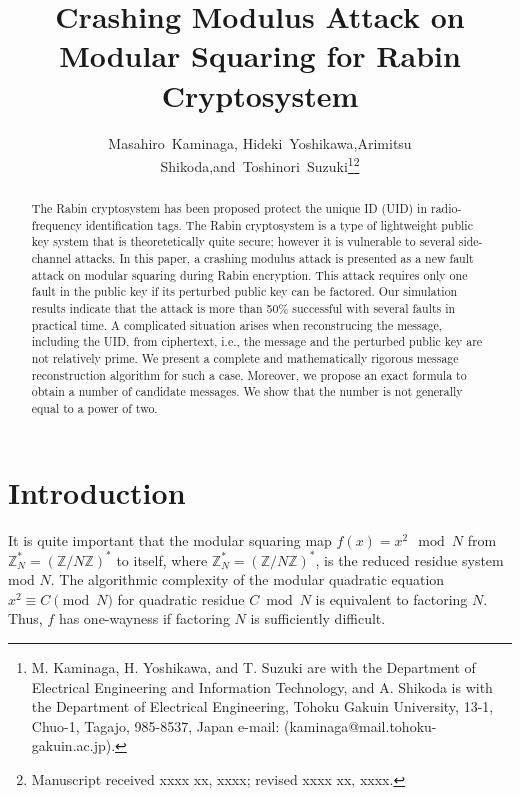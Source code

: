 \documentclass{article}
\begin{document}
\title{Crashing Modulus Attack on Modular Squaring for Rabin Cryptosystem}


\author{Masahiro~Kaminaga, Hideki~Yoshikawa,Arimitsu Shikoda,and~Toshinori~Suzuki\thanks{M. Kaminaga, H. Yoshikawa, and T. Suzuki are with the Department 
of Electrical Engineering and Information Technology, and A. Shikoda is with the Department 
of Electrical Engineering, Tohoku Gakuin University, 
13-1, Chuo-1, Tagajo, 985-8537, Japan e-mail: (kaminaga@mail.tohoku-gakuin.ac.jp).}\thanks{Manuscript received xxxx xx, xxxx; revised xxxx xx, xxxx.}}








\maketitle

\begin{abstract} The Rabin cryptosystem has been proposed protect the unique ID (UID) in
radio-frequency identification tags. 
The Rabin cryptosystem is a type of lightweight public key system that
is theoretetically quite secure; however it is vulnerable 
to several side-channel attacks. 
In this paper, a crashing modulus attack is presented as a new fault attack on
 modular squaring during Rabin encryption.
This attack requires only one fault in the public key if its perturbed public key can be factored. 
Our simulation results indicate that the attack is more than 50\% successful with several faults in practical time.
A complicated situation arises when reconstrucing the message, including the UID, from ciphertext, i.e., 
the message and the perturbed public key are not relatively prime. 
We present a complete and mathematically rigorous 
message reconstruction algorithm for such a case.
Moreover, we propose an exact formula to obtain a number of candidate messages.
We show that the number is not generally equal to a power of two.
\end{abstract}










\section{Introduction}\label{intro}
It is quite important that 
the modular squaring map $f(x) = x^2~\bmod N$ from $\mathbb{Z}_N^*=(\mathbb{Z}/N\mathbb{Z})^*$ to itself, 
where $\mathbb{Z}_N^*=(\mathbb{Z}/N\mathbb{Z})^*$, is the reduced residue system mod $N$.
The algorithmic complexity of 
the modular quadratic equation $x^2\equiv C\pmod{N}$ for quadratic residue $C\bmod N$ is equivalent to factoring $N$. 
Thus, $f$ has one-wayness if factoring $N$ is sufficiently difficult.
\end{document}
